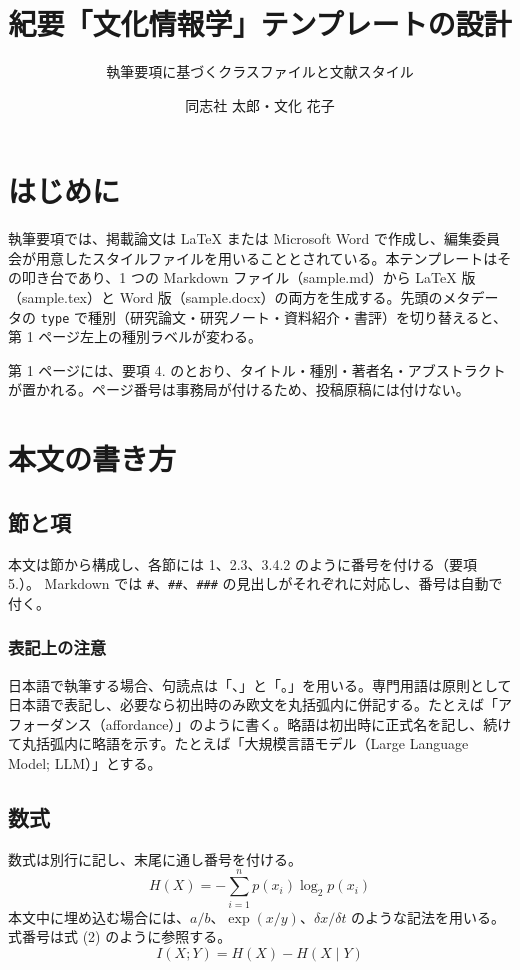 \documentclass[paper]{bunkajoho}
\title{紀要「文化情報学」テンプレートの設計}
\subtitle{執筆要項に基づくクラスファイルと文献スタイル}
\author{同志社 太郎・文化 花子}
\begin{document}
\maketitle

\section{はじめに}

執筆要項では、掲載論文は LaTeX または Microsoft Word で作成し、編集委員会が用意したスタイルファイルを用いることとされている。本テンプレートはその叩き台であり、1 つの Markdown ファイル（sample.md）から
LaTeX 版（sample.tex）と Word 版（sample.docx）の両方を生成する。先頭のメタデータの \texttt{type} で種別（研究論文・研究ノート・資料紹介・書評）を切り替えると、第 1 ページ左上の種別ラベルが変わる。

第 1 ページには、要項 4. のとおり、タイトル・種別・著者名・アブストラクトが置かれる。ページ番号は事務局が付けるため、投稿原稿には付けない。

\section{本文の書き方}

\subsection{節と項}

本文は節から構成し、各節には 1、2.3、3.4.2 のように番号を付ける（要項 5.）。
Markdown では \texttt{\#}、\texttt{\#\#}、\texttt{\#\#\#} の見出しがそれぞれに対応し、番号は自動で付く。

\subsubsection{表記上の注意}

日本語で執筆する場合、句読点は「、」と「。」を用いる。専門用語は原則として日本語で表記し、必要なら初出時のみ欧文を丸括弧内に併記する。たとえば「アフォーダンス（affordance）」のように書く。略語は初出時に正式名を記し、続けて丸括弧内に略語を示す。たとえば「大規模言語モデル（Large Language Model; LLM）」とする。

\subsection{数式}

数式は別行に記し、末尾に通し番号を付ける。
\begin{equation}
  H(X) = -\sum_{i=1}^{n} p(x_i) \log_2 p(x_i)
\end{equation}
本文中に埋め込む場合には、\(a/b\)、\(\exp(x/y)\)、\(\delta x/\delta t\) のような記法を用いる。式番号は式 (2) のように参照する。
\begin{equation}
  I(X;Y) = H(X) - H(X \mid Y)
\end{equation}
\end{document}

